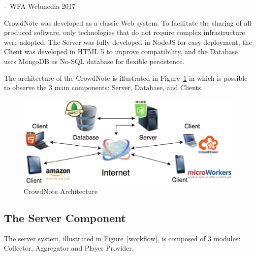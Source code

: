 -- 	WFA Webmedia 2017 \cite{175831}



CrowdNote was developed as a classic Web system. To facilitate the sharing of all produced software, only technologies that do not require complex infrastructure were adopted. The Server was fully developed in NodeJS for easy deployment, the Client was developed in HTML 5 to improve compatibility, and the Database uses MongoDB as No-SQL database for flexible persistence.

The architecture of the CrowdNote is illustrated in Figure~\ref{architecture} in which is possible to observe the 3 main components: Server, Database, and Clients.



\begin{figure}[h!]
	\centerline{\includegraphics[scale=0.3] {figure/Architecture}}
	\caption{CrowdNote Architecture}
	\label{architecture}
\end{figure}

\subsection{The Server Component}

The server system, illustrated in Figure~\ref{workflow}, is composed of 3 modules: Collector, Aggregator and Player Provider.



